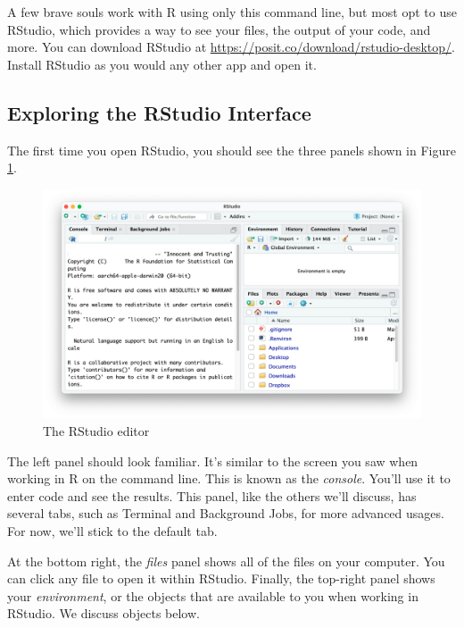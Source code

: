 \documentclass[
]{book}
\begin{document}
A few brave souls work with R using only this command line, but most opt to use RStudio, which provides a way to see your files, the output of your code, and more. You can download RStudio at \url{https://posit.co/download/rstudio-desktop/}. Install RStudio as you would any other app and open it.

\hypertarget{exploring-the-rstudio-interface}{%
\subsection*{Exploring the RStudio Interface}\label{exploring-the-rstudio-interface}}

The first time you open RStudio, you should see the three panels shown in Figure \ref{fig:rstudio-no-project}.

\begin{figure}
\includegraphics[width=1\linewidth]{assets/rstudio-no-project} \caption{The RStudio editor}\label{fig:rstudio-no-project}
\end{figure}

The left panel should look familiar. It's similar to the screen you saw when working in R on the command line. This is known as the \emph{console}. You'll use it to enter code and see the results. This panel, like the others we'll discuss, has several tabs, such as Terminal and Background Jobs, for more advanced usages. For now, we'll stick to the default tab.

At the bottom right, the \emph{files} panel shows all of the files on your computer. You can click any file to open it within RStudio. Finally, the top-right panel shows your \emph{environment}, or the objects that are available to you when working in RStudio. We discuss objects below.
\end{document}
